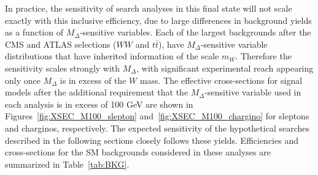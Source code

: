 In practice, the sensitivity of search analyses in this final state will not scale exactly with this inclusive efficiency, due to large differences in background yields as a function of $M_{\Delta}$-sensitive variables. Each of the largest backgrounds after the CMS and ATLAS selections ($WW$ and $t\bar{t}$), have $M_{\Delta}$-sensitive variable distributions that have inherited information of the scale $m_{W}$. Therefore the sensitivity scales strongly with $M_{\Delta}$, with significant experimental reach appearing only once $M_{\Delta}$ is in excess of the $W$ mass. The effective cross-sections for signal models after the additional requirement that the $M_{\Delta}$-sensitive variable used in each analysis is in excess of 100 GeV are shown in Figures~\ref{fig:XSEC_M100_slepton} and~\ref{fig:XSEC_M100_chargino} for sleptons and charginos, respectively. The expected sensitivity of the hypothetical searches described in the following sections closely follows these yields. Efficiencies and cross-sections for the SM backgrounds considered in these analyses are summarized in Table~\ref{tab:BKG}.

